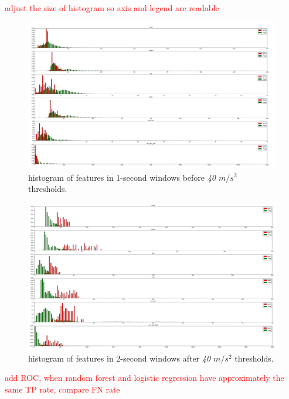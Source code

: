 \documentclass{soups}
\begin{document}
\textcolor{red}{adjust the size of histogram so axis and legend are readable}

\begin{figure}
\begin{center}
\includegraphics[width=1.0\columnwidth]{hist_features_before_win_size_1_2.png}
\end{center}
\caption{histogram of features in 1-second windows before \textit{40 $m/s^2$} thresholds.}
\end{figure}
\begin{figure}
\begin{center}
\includegraphics[width=1.0\columnwidth]{hist_features_after_win_size_1_2.png}
\end{center}
\caption{histogram of features in 2-second windows after \textit{40 $m/s^2$} thresholds.}
\end{figure}



\textcolor{red}{add ROC, when random forest and logistic regression have approximately the same TP rate, compare FN rate}
\end{document}
